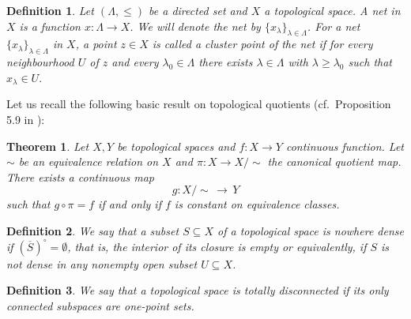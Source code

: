 \documentclass[pdflatex,sn-mathphys-num]{sn-jnl}
\theoremstyle{thmstyleone}%
\newtheorem{thm}{Theorem}
\theoremstyle{thmstyletwo}%
\theoremstyle{thmstylethree}%
\newtheorem{defi}{Definition}%
\begin{document}
\begin{defi}\label{def_netcluster}
    Let $(\Lambda,\leq)$ be a directed set and $X$ a topological space.
    A \emph{net} in $X$ is a function $x : \Lambda \to X$. We will denote the net by
    $\{x_\lambda\}_{\lambda \in \Lambda}$.
    For a net $\{x_\lambda\}_{\lambda \in \Lambda}$ in $X$, a point $z \in X$ is called a \emph{cluster point}
    of the net if for every neighbourhood $U$ of $z$ and every $\lambda_0 \in \Lambda$
    there exists $\lambda \in \Lambda$ with $\lambda \geq \lambda_0$ such that 
    $x_\lambda \in U.$
\end{defi}
\noindent Let us recall the following basic result on topological quotients (cf.~Proposition 5.9 in \cite[p.~94]{ma15}):
\begin{thm}\label{prop_quot}
    Let $X,Y$ be topological spaces and $f: X\rightarrow Y$ continuous function. Let $\sim$ be an equivalence relation on $X$ and $\pi : X\rightarrow X/\sim$ the canonical quotient map. 
    There exists a continuous map $$g: X/\sim\, \longrightarrow \, Y$$ such that $g \circ \pi =f$ if and only if $f$ is constant on equivalence classes.
\end{thm}
\begin{defi}
    We say that a subset $S\subseteq X$ of a topological space is \emph{nowhere dense} if $\left( \overline{S}\right)^\circ=\emptyset$, that is, the interior of its closure is empty or equivalently, if $S$ is not dense in any nonempty open subset $U\subseteq X$.
\end{defi}

\begin{defi}
    We say that a topological space is \emph{totally disconnected} if its only connected subspaces are one-point sets.
\end{defi}
\end{document}
